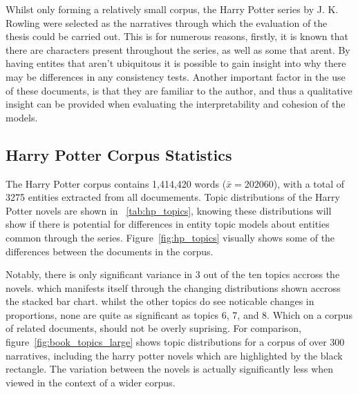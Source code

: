 \documentclass[10pt]{report}
\begin{document}
Whilst only forming a relatively small corpus, the Harry Potter series by J. K. Rowling were selected as the narratives through which the evaluation of the thesis could be carried out. This is for numerous reasons, firstly, it is known that there are characters present throughout the series, as well as some that arent. By having entites that aren't ubiquitous it is possible to gain insight into why there may be differences in any consistency tests. Another important factor in the use of these documents, is that they are familiar to the author, and thus a qualitative insight can be provided when evaluating the interpretability and cohesion of the models.

\subsection{Harry Potter Corpus Statistics}

The Harry Potter corpus contains 1,414,420 words ($\bar{x} = 202060$), with a total of 3275 entities extracted from all documements. Topic distributions of the Harry Potter novels are shown in ~\ref{tab:hp_topics}, knowing these distributions will show if there is potential for differences in entity topic models about entities common through the series. Figure~\ref{fig:hp_topics} visually shows some of the differences between the documents in the corpus.

Notably, there is only significant variance in 3 out of the ten topics accross the novels. which manifests itself through the changing distributions shown accross the stacked bar chart. whilst the other topics do see noticable changes in proportions, none are quite as significant as topics 6, 7, and 8. Which on a corpus of related documents, should not be overly suprising. For comparison, figure~\ref{fig:book_topics_large} shows topic distributions for a corpus of over 300 narratives, including the harry potter novels which are highlighted by the black rectangle. The variation between the novels is actually significantly less when viewed in the context of a wider corpus.
\end{document}
